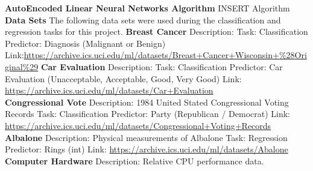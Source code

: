 \documentclass[twoside,11pt]{article}
\begin{document}
\textbf{AutoEncoded Linear Neural Networks Algorithm}\newline
\hspace*{10mm} INSERT Algorithm  \\

\newpage
{\noindent}{\bf Data Sets}\newline
The following data sets were used during the classification and regression tasks for this project.\newline
{\bf Breast Cancer}\newline
Description: \newline
Task: Classification\newline
Predictor: Diagnosis (Malignant or Benign)\newline
Link:\newline \url{https://archive.ics.uci.edu/ml/datasets/Breast+Cancer+Wisconsin+%28Original%29}\newline
{\noindent}\textbf{Car Evaluation}\newline
Description:\newline
Task: Classification\newline
Predictor: Car Evaluation (Unacceptable, Acceptable, Good, Very Good)\newline
Link: \newline
\url{https://archive.ics.uci.edu/ml/datasets/Car+Evaluation}\\
{\noindent}\textbf{Congressional Vote}\newline
Description: 1984 United Stated Congressional Voting Records\newline
Task: Classification \newline
Predictor: Party (Republican / Democrat) \newline
Link: \newline
\url{https://archive.ics.uci.edu/ml/datasets/Congressional+Voting+Records}\newline
{\noindent}\textbf{Albalone}\newline
Description: Physical measurements of Albalone\newline
Task: Regression\newline
Predictor: Rings (int)\newline
Link: \newline
\url{https://archive.ics.uci.edu/ml/datasets/Abalone}\newline
{\noindent}\textbf{Computer Hardware}\newline
Description: Relative CPU performance data.\newline
\end{document}
